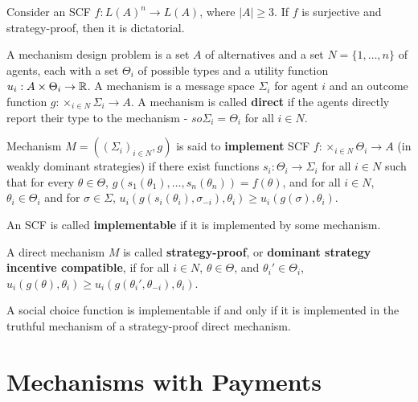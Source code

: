 \begin{thm}
  \label{sec:mecahnism-design-2}
  Consider an SCF $f: L(A)^{n} \rightarrow L(A)$, where $|A| \geq 3$.
  If $f$ is surjective and strategy-proof, then it is dictatorial.
\end{thm}


\begin{defn}
  \label{sec:mecahnism-design-4}
  A mechanism design problem is a set $A$ of alternatives and a set $N
  = \{ 1, \dots, n \} $ of agents, each with a set $\Theta_{i}$ of
  possible types and a utility function $u_{i}: A \times \Theta_{i}
  \rightarrow \mathbb{R}$.  A mechanism is a message space $\Sigma_{i}$ for
  agent $i$ and an outcome function $g: \times_{i \in N} \Sigma_{i}
  \rightarrow A$.  A mechanism is called \textbf{direct} if the agents
  directly report their type to the mechanism - $so \Sigma_{i} =
  \Theta_{i}$ for all $i \in N$.

  Mechanism $M =((\Sigma_{i})_{i \in N}, g)$ is said to
  \textbf{implement} SCF $f: \times_{i \in N} \Theta_{i} \rightarrow
  A$ (in weakly dominant strategies) if there exist functions $s_{i}:
  \Theta_{i} \rightarrow \Sigma_{i}$ for all $i \in N$ such that for
  every $\theta \in \Theta$, $g(s_{1}(\theta_{1}), \dots,
  s_{n}(\theta_{n})) = f(\theta)$, and for all $i \in N$, $\theta_{i}
  \in \Theta_{i}$ and for $\sigma \in \Sigma$,
  $u_{i}(g(s_{i}(\theta_{i}), \sigma_{-i}), \theta_{i}) \geq
  u_{i}(g(\sigma), \theta_{i})$.

  An SCF is called \textbf{implementable} if it is implemented by some
  mechanism.

  A direct mechanism $M$ is called \textbf{strategy-proof}, or
  \textbf{dominant strategy incentive compatible}, if for all $i \in
  N$, $\theta \in \Theta$, and $\theta_{i}' \in \Theta_{i}$,
  $u_{i}(g(\theta), \theta_{i}) \geq u_{i}(g(\theta_{i}',
  \theta_{-i}), \theta_{i})$.  
\end{defn}

\begin{thm}
  \label{sec:mecahnism-design-3}
  A social choice function is implementable if and only if it is
  implemented in the truthful mechanism of a strategy-proof direct mechanism.
\end{thm}

\section{Mechanisms with Payments}
\label{sec:mech-with-paym}

